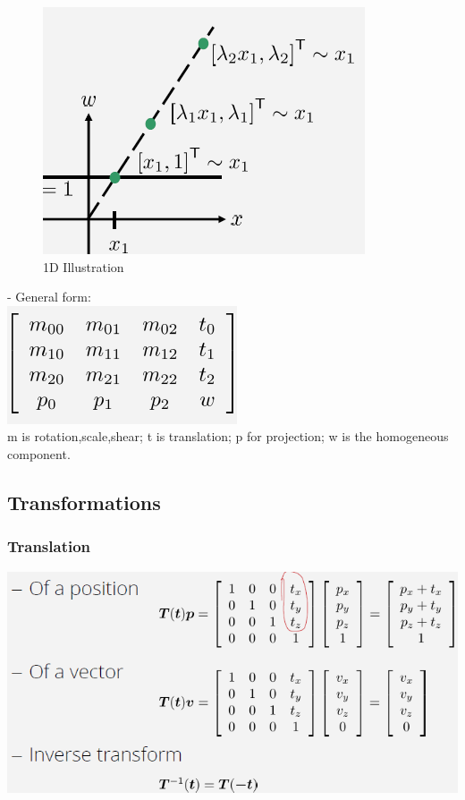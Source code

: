 \documentclass{article}
\begin{document}
\begin{figure}
\includegraphics[scale=0.6]{image25.png}
\caption{1D Illustration}
\end{figure}
- General form:\\
\includegraphics[scale=0.6]{image26.png}\\
m is rotation,scale,shear; t is translation; p for projection; w is the homogeneous component.\\

\subsection{Transformations}
\subsubsection{Translation}
\includegraphics[scale=0.6]{image27.png}\\
\end{document}
